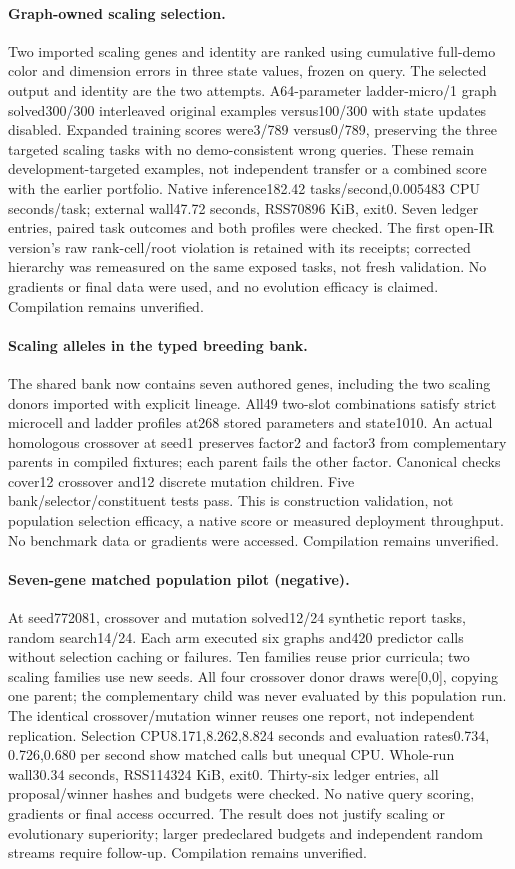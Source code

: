 \documentclass[11pt]{article}
\begin{document}
\paragraph{Graph-owned scaling selection.}
Two imported scaling genes and identity are ranked using cumulative full-demo
color and dimension errors in three state values, frozen on query. The selected
output and identity are the two attempts. A64-parameter ladder-micro/1 graph
solved300/300 interleaved original examples versus100/300 with state updates
disabled. Expanded training scores were3/789 versus0/789, preserving the three
targeted scaling tasks with no demo-consistent wrong queries. These remain
development-targeted examples, not independent transfer or a combined score
with the earlier portfolio. Native inference182.42 tasks/second,0.005483 CPU
seconds/task; external wall47.72 seconds, RSS70896 KiB, exit0. Seven ledger
entries, paired task outcomes and both profiles were checked. The first open-IR
version's raw rank-cell/root violation is retained with its receipts; corrected
hierarchy was remeasured on the same exposed tasks, not fresh validation.
No gradients or final data were used, and no evolution efficacy is claimed.
Compilation remains unverified.
\paragraph{Scaling alleles in the typed breeding bank.}
The shared bank now contains seven authored genes, including the two scaling
donors imported with explicit lineage. All49 two-slot combinations satisfy
strict microcell and ladder profiles at268 stored parameters and state1010.
An actual homologous crossover at seed1 preserves factor2 and factor3 from
complementary parents in compiled fixtures; each parent fails the other factor.
Canonical checks cover12 crossover and12 discrete mutation children. Five
bank/selector/constituent tests pass. This is construction validation, not
population selection efficacy, a native score or measured deployment throughput.
No benchmark data or gradients were accessed. Compilation remains unverified.
\paragraph{Seven-gene matched population pilot (negative).}
At seed772081, crossover and mutation solved12/24 synthetic report tasks,
random search14/24. Each arm executed six graphs and420 predictor calls without
selection caching or failures. Ten families reuse prior curricula; two scaling
families use new seeds. All four crossover donor draws were[0,0], copying one
parent; the complementary child was never evaluated by this population run.
The identical crossover/mutation winner reuses one report, not independent
replication. Selection CPU8.171,8.262,8.824 seconds and evaluation rates0.734,
0.726,0.680 per second show matched calls but unequal CPU. Whole-run wall30.34
seconds, RSS114324 KiB, exit0. Thirty-six ledger entries, all proposal/winner
hashes and budgets were checked. No native query scoring, gradients or final
access occurred. The result does not justify scaling or evolutionary superiority;
larger predeclared budgets and independent random streams require follow-up.
Compilation remains unverified.
\end{document}
